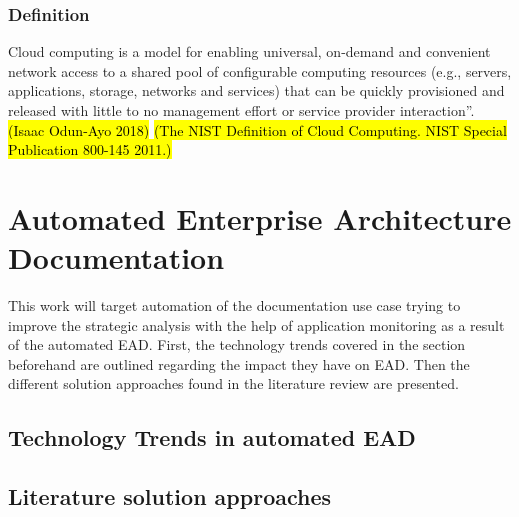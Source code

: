 \subsubsection{Definition}
Cloud computing is a model for enabling universal, on-demand and convenient network access to a shared pool of configurable computing resources (e.g., servers, applications, storage, networks and services) that can be quickly provisioned and released with little to no management effort or service provider interaction”.
\hl{(Isaac Odun-Ayo 2018)}
\hl{(The NIST Definition of Cloud Computing. NIST Special Publication 800-145 2011.)}



\section{Automated Enterprise Architecture Documentation}

This work will target automation of the documentation use case  trying to improve the strategic analysis with the help of application monitoring as a result of the automated EAD. First, the technology trends covered in the section beforehand are outlined regarding the impact they have on EAD. Then the different solution approaches found in the literature review are presented.

\subsection{Technology Trends in automated EAD} 

\subsection{Literature solution approaches}

\subsection{}